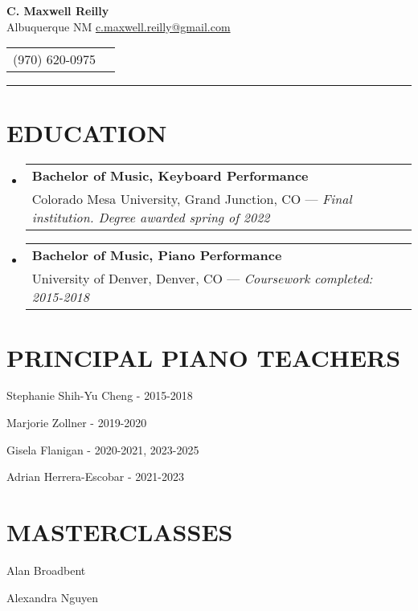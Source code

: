 \documentclass{article}
\makeatletter
\newcommand{\cvItem}[1]{
        \item {
            {#1}
        }
    }
\newcommand{\cvSubHeadingListStart}{\begin{itemize}[leftmargin=0pt]}
\newcommand{\cvSubHeadingListEnd}{\end{itemize}}
\newcommand{\cvItemListStart}{\begin{itemize}[leftmargin=10pt]}
\newcommand{\cvItemListEnd}{\end{itemize}}
\newcommand{\cvEducationSubheading}[3]{
        \vspace{-1pt}\item[]
            \begin{tabular*}{1\textwidth}[t]{l@{\extracolsep{\fill}}r}
                \textbf{#1} \\ %
                {#2} %
                { --- \em #3} \\ %
            \end{tabular*}
    }
\makeatother
\begin{document}
    \begin{center}
        \textbf{\Large C. Maxwell Reilly} \\ Albuquerque NM \hspace{2mm}
        \href{mailto:c.maxwell.reilly@gmail.com}{c.maxwell.reilly@gmail.com}
    \end{center}\vspace{-11pt}
    \begin{center}
        \begin{tabular}{c c}
            (970) 620-0975 \\
        \end{tabular}\vspace{-8pt}
    \end{center}
    \rule{\textwidth}{1pt}

    \section{EDUCATION}
        \cvSubHeadingListStart
            \cvEducationSubheading
                {Bachelor of Music, Keyboard Performance}
                {Colorado Mesa University, Grand Junction, CO}
                {Final institution. Degree awarded spring of 2022}
            \cvEducationSubheading
                {Bachelor of Music, Piano Performance}
                {University of Denver, Denver, CO}
                {Coursework completed: 2015-2018}
        \cvSubHeadingListEnd

    \section{PRINCIPAL PIANO TEACHERS}
        \cvItemListStart
            \begin{multicols}{2}
                \cvItem{Stephanie Shih-Yu Cheng - 2015-2018}
                \cvItem{Marjorie Zollner - 2019-2020}
                \cvItem{Gisela Flanigan - 2020-2021, 2023-2025}
                \cvItem{Adrian Herrera-Escobar - 2021-2023}
            \end{multicols}
        \cvItemListEnd

    \section{MASTERCLASSES}
        \cvItemListStart
            \begin{multicols}{2}
                \cvItem{Alan Broadbent}
                \cvItem{Alexandra Nguyen}
            \end{multicols}
        \cvItemListEnd
\end{document}
